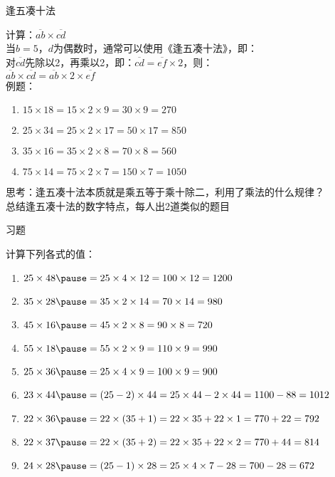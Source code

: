 \documentclass[aspectratio=169]{ctexbeamer} %
\date{\today}
\begin{document}
\begin{frame}[t]{逢五凑十法}
\begin{spacing}{1.2}
\normalsize
计算：$\overline{ab} \times \overline{cd}$ \\
当$b = 5$，$d$为偶数时，通常可以使用《逢五凑十法》，即：\\
对$\overline{cd}$先除以2，再乘以2，即：$\overline{cd} = \overline{ef} \times 2$，则：\\
$\overline{ab} \times \overline{cd} = \overline{ab} \times 2 \times \overline{ef} $ \\
例题：
\begin{enumerate}[label={\arabic*.}]
\item $15 \times 18 = 15 \times 2 \times 9=30 \times 9 = 270$
\item $25 \times 34 = 25 \times 2 \times 17=50 \times 17 = 850$
\item $35 \times 16 = 35 \times 2 \times 8=70 \times 8 = 560$
\item $75 \times 14 = 75 \times 2 \times 7=150 \times 7 = 1050$
\end{enumerate}
\alert{思考：逢五凑十法本质就是乘五等于乘十除二，利用了乘法的什么规律？} \\
\alert{总结逢五凑十法的数字特点，每人出2道类似的题目} \\
\end{spacing}
\end{frame}

\begin{frame}[t]{习题}
\begin{spacing}{1.2}
\normalsize
计算下列各式的值：
\begin{enumerate}[label={\arabic*.}]
\item $25 \times 48 \pause = 25 \times 4 \times 12 = 100 \times 12 = 1200$
\item $35 \times 28 \pause = 35 \times 2 \times 14 = 70 \times 14 = 980$
\item $45 \times 16 \pause = 45 \times 2 \times 8 = 90 \times 8 = 720$
\item $55 \times 18 \pause = 55 \times 2 \times 9 = 110 \times 9 = 990$
\item $25 \times 36 \pause = 25 \times 4 \times 9 = 100 \times 9 = 900$
\item $23 \times 44 \pause = (25 - 2) \times 44 = 25 \times 44 - 2 \times 44 = 1100 - 88 = 1012$
\item $22 \times 36 \pause = 22 \times (35+1) = 22 \times 35 + 22 \times 1 = 770 + 22 = 792$
\item $22 \times 37 \pause = 22 \times (35+2) = 22 \times 35 + 22 \times 2 = 770 + 44 = 814$
\item $24 \times 28 \pause = (25-1) \times 28 = 25 \times 4 \times 7 - 28 = 700 - 28 = 672$
\end{enumerate}

\end{spacing}
\end{frame}
\end{document}
